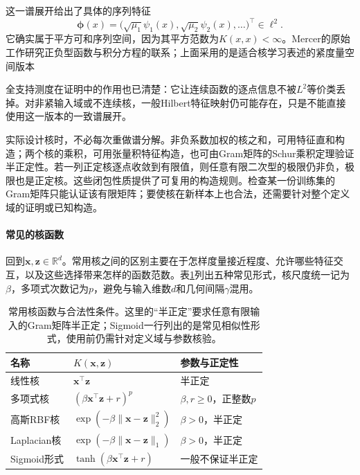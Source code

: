 这一谱展开给出了具体的序列特征
\[
  \bm{\phi}(x)
  =\bigl(\sqrt{\mu_1}\psi_1(x),
          \sqrt{\mu_2}\psi_2(x),\ldots\bigr)^{\top}\in\ell^2.
\]
它确实属于平方可和序列空间，因为其平方范数为$K(x,x)<\infty$。Mercer的原始工作研究正负型函数与积分方程的联系；上面采用的是适合核学习表述的紧度量空间版本

全支持测度在证明中的作用也已清楚：它让连续函数的逐点信息不被$L^2$等价类丢掉。对非紧输入域或不连续核，一般Hilbert特征映射仍可能存在，只是不能直接使用这一版本的一致谱展开。

实际设计核时，不必每次重做谱分解。非负系数加权的核之和，可用特征直和构造；两个核的乘积，可用张量积特征构造，也可由Gram矩阵的Schur乘积定理验证半正定性。若一列正定核逐点收敛到有限值，则任意有限二次型的极限仍非负，极限也是正定核。这些闭包性质提供了可复用的构造规则。检查某一份训练集的Gram矩阵只能认证该有限矩阵；要使核在新样本上也合法，还需要针对整个定义域的证明或已知构造。

\paragraph{常见的核函数}
\label{sec:classification-svm-common-kernels}

回到$\bm{x},\bm{z}\in\mathbb{R}^d$。常用核之间的区别主要在于怎样度量接近程度、允许哪些特征交互，以及这些选择带来怎样的函数范数。表\ref{tab:classification-svm-kernels}列出五种常见形式，核尺度统一记为$\beta$，多项式次数记为$p$，避免与输入维数$d$和几何间隔$\gamma$混用。

\begin{table}[htbp]
  \centering
  \small
  \begin{tabularx}{\linewidth}{@{}>{\raggedright\arraybackslash}p{18mm}>{\raggedright\arraybackslash}X>{\raggedright\arraybackslash}p{27mm}@{}}
    \toprule
    名称 & $K(\bm{x},\bm{z})$ & 参数与正定性\\
    \midrule
    线性核 & $\bm{x}^{\top}\bm{z}$ & 半正定\\
    多项式核 & $(\beta\bm{x}^{\top}\bm{z}+r)^p$ & $\beta,r\ge0$，正整数$p$\\
    高斯RBF核 & $\exp(-\beta\lVert\bm{x}-\bm{z}\rVert_2^2)$ & $\beta>0$，半正定\\
    Laplacian核 & $\exp(-\beta\lVert\bm{x}-\bm{z}\rVert_1)$ & $\beta>0$，半正定\\
    Sigmoid形式 & $\tanh(\beta\bm{x}^{\top}\bm{z}+r)$ & 一般不保证半正定\\
    \bottomrule
  \end{tabularx}
  \caption{常用核函数与合法性条件。这里的“半正定”要求任意有限输入的Gram矩阵半正定；Sigmoid一行列出的是常见相似性形式，使用前仍需针对定义域与参数核验。}
  \label{tab:classification-svm-kernels}
\end{table}

